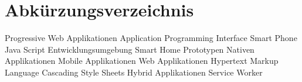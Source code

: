 \chapter*{Abkürzungsverzeichnis}
\pagestyle{plain}

\begin{acronym}[AUTOSAR]

   				{Progressive Web Applikationen}
  				{Application Programming Interface}
  				{Smart Phone}
  				{Java Script}
  				{Entwicklungsumgebung}
  				{Smart Home Prototypen}
  				{Nativen Applikationen}
  				{Mobile Applikationen}
 					{Web Applikationen}
 				{Hypertext Markup Language}
 				{Cascading Style Sheets}
 				{Hybrid Applikationen}
 					{Service Worker}
\end{acronym}